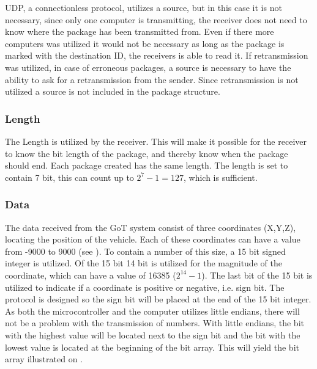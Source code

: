 UDP, a connectionless protocol, utilizes a source, but in this case it is not necessary, since only one computer is transmitting, the receiver does not need to know where the package has been transmitted from. Even if there more computers was utilized it would not be necessary as long as the package is marked with the destination ID, the receivers is able to read it. If retransmission was utilized, in case of erroneous packages, a source is necessary to have the ability to ask for a retransmission from the sender. Since retransmission is not utilized a source is not included in the package structure.

\subsubsection{Length}
The Length is utilized by the receiver. This will make it possible for the receiver to know the bit length of the package, and thereby know when the package should end. Each package created has the same length. The length is set to contain 7 bit, this can count up to $2^{7}-1 = 127$, which is sufficient.

\subsubsection{Data}
The data received from the GoT system consist of three coordinates (X,Y,Z), locating the position of the vehicle. Each of these coordinates can have a value from -9000 to 9000 (see ). To contain a number of this size, a 15 bit signed integer is utilized. Of the 15 bit 14 bit is utilized for the magnitude of the coordinate, which can have a value of 16385 ($2^{14}-1$). The last bit of the 15 bit is utilized to indicate if a coordinate is positive or negative, i.e. sign bit. The protocol is designed so the sign bit will be placed at the end of the 15 bit integer. As both the microcontroller and the computer utilizes little endians, there will not be a problem with the transmission of numbers. With little endians, the bit with the highest value will be located next to the sign bit and the bit with the lowest value is located at the beginning of the bit array. This will yield the bit array illustrated on .

